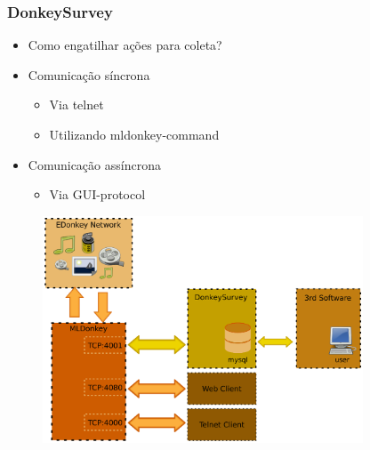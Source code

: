 \documentclass{beamer}
\newenvironment{changemargin}[2]{%
\begin{list}{}{%
\setlength{\leftmargin}{#1}%
\setlength{\rightmargin}{#2}%
\setlength{\listparindent}{\parindent}%
\setlength{\itemindent}{\parindent}%
\setlength{\parsep}{\parskip}%
}%
\item[]}{\end{list}}
\begin{document}
\begin{frame}
  \frametitle{DonkeySurvey}
\hspace{0.25in}
     \begin{itemize}
         \item Como engatilhar ações para coleta? 
         \item Comunicação síncrona 
         \begin{itemize}
             \item Via telnet
             \item Utilizando mldonkey-command
         \end{itemize}
         \item Comunicação assíncrona 
         \begin{itemize}
             \item Via GUI-protocol
          \end{itemize}
      \end{itemize}
\end{frame}


\begin{frame}
\begin{changemargin}{-2cm}{-2cm}
  \begin{figure}
    \includegraphics[width=360px]{img/DonkeySurvey.ps}
  \end{figure} 
\end{changemargin}
\end{frame}
\end{document}
